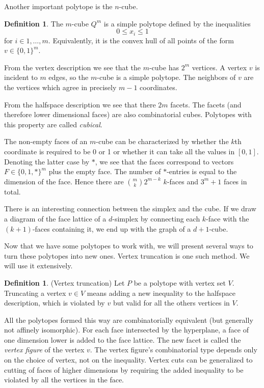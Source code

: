 \documentclass[a4paper,12pt]{book}
\theoremstyle{plain}
\theoremstyle{definition}
\newtheorem{definition}[theorem]{Definition}
\begin{document}
Another important polytope is the $n$-cube.

\begin{definition}
 The $m$-cube $Q^m$ is a simple polytope defined by the inequalities
\begin{equation}
 0 \leq x_i \leq 1 
\end{equation}
for $i \in 1,\dots, m$. Equivalently, it is the convex hull of all points of the form $v \in \{0,1\}^m$.
\end{definition}
From the vertex description we see that the $m$-cube has $2^m$ vertices. A vertex $v$
is incident to $m$ edges, so the $m$-cube is a simple polytope. The neighbors of $v$ are
the vertices which agree in precisely $m-1$ coordinates.

From the halfspace description we see that there $2m$ facets. The facets (and therefore lower dimensional faces)
are also combinatorial cubes. Polytopes with this property are called \textit{cubical}. 

The non-empty faces of an $m$-cube can be characterized by whether the $k$th coordinate 
is required to be 0 or 1 or whether it can take all the values in $[0,1]$. Denoting the latter case by $*$, we see
that the faces correspond to vectors $F \in \{0,1,*\}^m$ plus the empty face. The number of $*$-entries 
is equal to the dimension of the face. Hence there are $\binom{m}{k} 2^{m-k}$ $k$-faces and $3^m +1$ faces in total.

There is an interesting connection between the simplex and the cube. If we draw a diagram
of the face lattice of a $d$-simplex by connecting each $k$-face with the $(k+1)$-faces containing it,
we end up with the graph of a $d+1$-cube.

Now that we have some polytopes to work with, we will present several ways to turn these polytopes into new ones.
Vertex truncation is one such method.
We will use it extensively.
\begin{definition}
(Vertex truncation) Let $P$ be a polytope with vertex set $V$. Truncating a vertex $v \in V$ means adding
a new inequality to the halfspace description, which is violated by $v$ but valid for all the others vertices in $V$.
\end{definition}
All the polytopes formed this way are combinatorially equivalent (but generally not affinely isomorphic). 
For each face intersected by the hyperplane, 
a face of one dimension lower is added to the face lattice. The new facet is 
called the \textit{vertex figure} of the vertex $v$. The vertex figure's combinatorial type 
depends only on the choice of vertex, not on the inequality. Vertex cuts can be generalized to cutting of 
faces of higher dimensions by requiring the added inequality to be violated by 
all the vertices in the face. 
\end{document}
